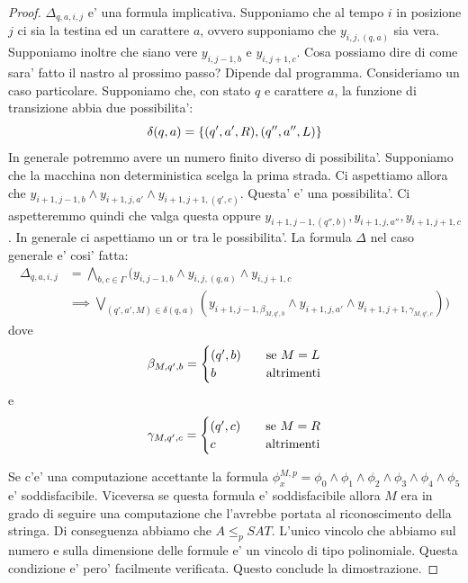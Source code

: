 \begin{proof}

    $\Delta_{q,a,i,j}$ e' una formula implicativa. Supponiamo che al tempo $i$ in posizione $j$ ci
    sia la testina ed un carattere $a$, ovvero supponiamo che $y_{i,j,(q,a)}$ sia vera. Supponiamo
    inoltre che siano vere $y_{i,j-1,b}$ e $y_{i,j+1,c}$. Cosa possiamo dire di come sara' fatto il
    nastro al prossimo passo? Dipende dal programma. Consideriamo un caso particolare. Supponiamo
    che, con stato $q$ e carattere $a$, la funzione di transizione abbia due possibilita':
    \begin{equation*}
        \delta(q,a) = \left\{(q',a',R),(q'',a'',L)\right\}
    \end{equation*}
    In generale potremmo avere un numero finito diverso di possibilita'. Supponiamo che la macchina non
    deterministica scelga la prima strada. Ci aspettiamo allora che $y_{i+1,j-1,b} \land y_{i+1,j,a'}
    \land y_{i+1,j+1,(q',c)}$. Questa' e' una possibilita'. Ci aspetteremmo quindi che valga questa oppure
    $y_{i+1,j-1,(q'',b)},y_{i+1,j,a''},y_{i+1,j+1,c}$. In generale ci aspettiamo un or tra le
    possibilita'. 
    La formula $\Delta$ nel caso generale e' cosi' fatta:
    \begin{align*}
        \Delta_{q,a,i,j} &= \bigwedge_{b,c \in \Gamma}( y_{i,j-1,b} \land y_{i,j,(q,a)} \land
        y_{i,j+1,c} \\ &\implies \bigvee_{(q',a',M) \in \delta(q,a)}(y_{i+1,j-1,\beta_{M,q',b}} \land
        y_{i+1,j,a'} \land y_{i+1,j+1,\gamma_{M,q',c}}))
    \end{align*}
    dove
    \begin{equation*}
        \beta_{M,q',b} =
        \begin{cases}
            (q',b) \quad &\text{se $M = L$}\\
            b \quad &\text{altrimenti}\\
        \end{cases}
    \end{equation*}
    e
    \begin{equation*}
        \gamma_{M,q',c} =
        \begin{cases}
            (q',c) \quad &\text{se $M = R$}\\
            c \quad &\text{altrimenti}\\
        \end{cases}
    \end{equation*}

    Se c'e' una computazione accettante la formula $\phi_{x}^{M,p} = \phi_{0} \land \phi_{1} \land
    \phi_{2} \land \phi_{3} \land \phi_{4} \land \phi_{5}$ e' soddisfacibile. Viceversa se questa
    formula e' soddisfacibile allora $M$ era in grado di seguire una computazione che l'avrebbe
    portata al riconoscimento della stringa. Di conseguenza abbiamo che $A \leq_{p} SAT$. L'unico
    vincolo che abbiamo sul numero e sulla dimensione delle formule e' un vincolo di tipo
    polinomiale. Questa condizione e' pero' facilmente verificata. Questo conclude la dimostrazione.

\end{proof}

